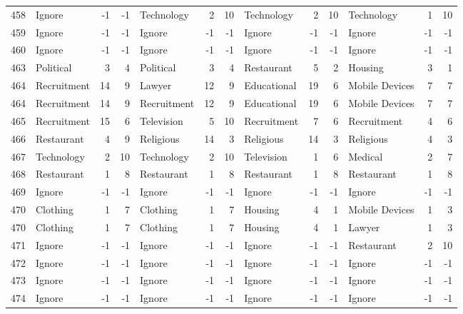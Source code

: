 \begin{figure}[htbp]
\begin{tabular}{rlrrlrrlrrlrr}
    458   & Ignore & -1    & -1    & Technology & 2     & 10    & Technology & 2     & 10    & Technology & 1     & 10 \\
    459   & Ignore & -1    & -1    & Ignore & -1    & -1    & Ignore & -1    & -1    & Ignore & -1    & -1 \\
    460   & Ignore & -1    & -1    & Ignore & -1    & -1    & Ignore & -1    & -1    & Ignore & -1    & -1 \\
    463   & Political & 3     & 4     & Political & 3     & 4     & Restaurant & 5     & 2     & Housing & 3     & 1 \\
    464   & Recruitment & 14    & 9     & Lawyer & 12    & 9     & Educational & 19    & 6     & Mobile Devices & 7     & 7 \\
    464   & Recruitment & 14    & 9     & Recruitment & 12    & 9     & Educational & 19    & 6     & Mobile Devices & 7     & 7 \\
    465   & Recruitment & 15    & 6     & Television & 5     & 10    & Recruitment & 7     & 6     & Recruitment & 4     & 6 \\
    466   & Restaurant & 4     & 9     & Religious & 14    & 3     & Religious & 14    & 3     & Religious & 4     & 3 \\
    467   & Technology & 2     & 10    & Technology & 2     & 10    & Television & 1     & 6     & Medical & 2     & 7 \\
    468   & Restaurant & 1     & 8     & Restaurant & 1     & 8     & Restaurant & 1     & 8     & Restaurant & 1     & 8 \\
    469   & Ignore & -1    & -1    & Ignore & -1    & -1    & Ignore & -1    & -1    & Ignore & -1    & -1 \\
    470   & Clothing & 1     & 7     & Clothing & 1     & 7     & Housing & 4     & 1     & Mobile Devices & 1     & 3 \\
    470   & Clothing & 1     & 7     & Clothing & 1     & 7     & Housing & 4     & 1     & Lawyer & 1     & 3 \\
    471   & Ignore & -1    & -1    & Ignore & -1    & -1    & Ignore & -1    & -1    & Restaurant & 2     & 10 \\
    472   & Ignore & -1    & -1    & Ignore & -1    & -1    & Ignore & -1    & -1    & Ignore & -1    & -1 \\
    473   & Ignore & -1    & -1    & Ignore & -1    & -1    & Ignore & -1    & -1    & Ignore & -1    & -1 \\
    474   & Ignore & -1    & -1    & Ignore & -1    & -1    & Ignore & -1    & -1    & Ignore & -1    & -1 \\

\end{tabular}
\end{figure}
